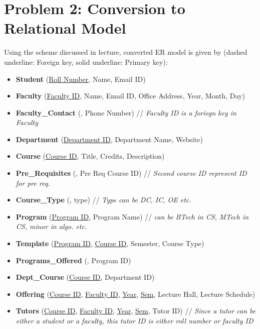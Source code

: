 \documentclass[a4paper]{article}
\begin{document}
\section*{Problem 2: Conversion to Relational Model}
Using the scheme discussed in lecture, converted ER model is given by (dashed underline: Foreign key, solid underline: Primary key):
\begin{itemize}
	\item \textbf{Student} (\underline{Roll Number}, Name, Email ID)

	\item \textbf{Faculty} (\underline{Faculty ID}, Name, Email ID, Office Address, Year, Month, Day)

	\item \textbf{Faculty\_Contact} (, Phone Number) // \textit{Faculty ID is a foriegn key in Faculty}

	\item \textbf{Department} (\underline{Department ID}, Department Name, Website)

	\item \textbf{Course} (\underline{Course ID}, Title, Credits, Description)

	\item \textbf{Pre\_Requisites} (, Pre Req Course ID) // \textit{Second course ID represent ID for pre req.}

	\item \textbf{Course\_Type} (, type) // \textit{Type can be DC, IC, OE etc.}

	\item \textbf{Program} (\underline{Program ID}, Program Name) // \textit{can be BTech in CS, MTech in CS, minor in algo. etc.}

	\item \textbf{Template} (\underline{Program ID}, \underline{Course ID}, Semester, Course Type)

	\item \textbf{Programs\_Offered} (, Program ID)

	\item \textbf{Dept\_Course} (\underline{Course ID}, Department ID)

	\item \textbf{Offering} (\underline{Course ID}, \underline{Faculty ID}, \underline{Year}, \underline{Sem}, Lecture Hall, Lecture Schedule)

	\item \textbf{Tutors} (\underline{Course ID}, \underline{Faculty ID}, \underline{Year}, \underline{Sem}, Tutor ID) // \textit{Since a tutor can be either a student or a faculty, this tutor ID is either roll number or faculty ID}


\end{itemize}
\end{document}
